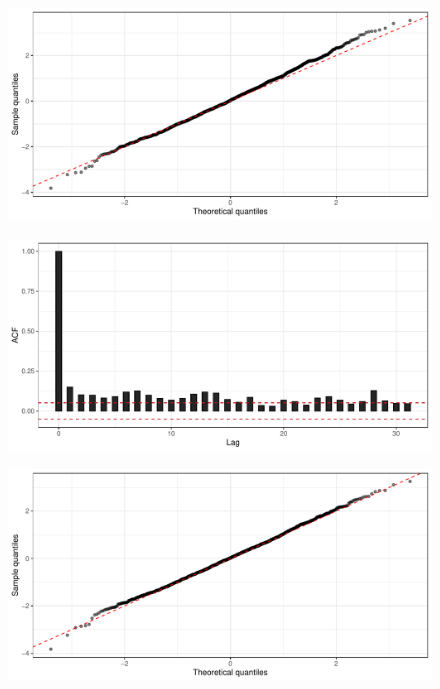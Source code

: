 \documentclass[11pt]{article}
\begin{document}
\begin{suppfigure}[ht]
	\centering
	\begin{subfigure}[t]{0.49\linewidth}
		\centering
		\includegraphics[width=1\linewidth]{figs/supp-figure-2a.pdf} 
		\caption{} 
		\label{supp-fig:qqplot-poisson}
	\end{subfigure}
	\hfill
	\begin{subfigure}[t]{0.49\linewidth}
		\centering
		\includegraphics[width=1\linewidth]{figs//supp-figure-2b.pdf}
		\caption{} 
		\label{supp-fig:correlation}
	\end{subfigure}
	\hfill
	\begin{subfigure}[t]{0.49\linewidth}
		\centering
		\includegraphics[width=1\linewidth]{figs/supp-figure-2c.pdf} 

\end{subfigure}
\end{suppfigure}
\end{document}
